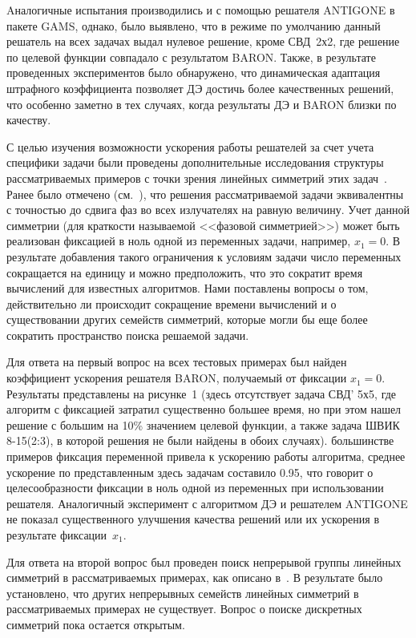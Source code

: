 Aналогичные испытания производились и с помощью решателя ANTIGONE в пакете GAMS, однако, было выявлено, что в режиме по умолчанию данный решатель на всех задачах выдал нулевое решение, кроме СВД~2х2, где решение по целевой функции совпадало с результатом BARON.
Также, в результате проведенных экспериментов было обнаружено, что динамическая адаптация штрафного коэффициента позволяет ДЭ достичь более качественных решений, что особенно заметно в тех случаях, когда результаты ДЭ и BARON близки по качеству.

С целью изучения возможности ускорения работы решателей за счет учета специфики задачи были проведены дополнительные исследования
структуры рассматриваемых примеров с точки зрения линейных симметрий этих задач~\cite{yurkov:symmetry}.
Ранее было отмечено (см.~\cite{tyu:daor}), что решения рассматриваемой задачи эквивалентны с точностью до сдвига
фаз во всех излучателях на равную величину.
Учет данной симметрии (для краткости называемой <<фазовой симметрией>>) может
быть реализован фиксацией в ноль одной из переменных задачи, например, $x_1=0$.
В результате добавления такого ограничения к условиям задачи число переменных сокращается
на единицу и можно предположить, что это сократит время вычислений для известных алгоритмов.
Нами поставлены вопросы о том, действительно ли происходит сокращение времени вычислений и о
существовании других семейств симметрий, которые могли бы еще более сократить пространство поиска решаемой задачи.

Для ответа на первый вопрос на всех тестовых примерах был найден коэффициент ускорения решателя BARON,
получаемый от фиксации $x_1=0$. Результаты представлены на рисунке~1 (здесь отсутствует задача СВД' 5х5, где
алгоритм с фиксацией затратил существенно большее время, но при этом нашел решение с большим на 10\% значением
целевой функции, а также задача ШВИК 8-15(2:3), в которой решения не были найдены в обоих случаях).
 большинстве примеров фиксация переменной привела к ускорению работы алгоритма, среднее ускорение по
представленным здесь задачам составило 0.95, что говорит о целесообразности фиксации в ноль одной из переменных
при использовании решателя. Аналогичный эксперимент с алгоритмом ДЭ и решателем ANTIGONE не показал существенного
улучшения качества решений или их ускорения в результате фиксации~$x_1$.

Для ответа на второй вопрос был проведен поиск непрерывой группы линейных симметрий в рассматриваемых примерах,
как описано в~\cite{yurkov:symmetry}. В результате было установлено, что других непрерывных семейств линейных
симметрий в рассматриваемых примерах не существует. Вопрос о поиске дискретных симметрий пока остается открытым.

